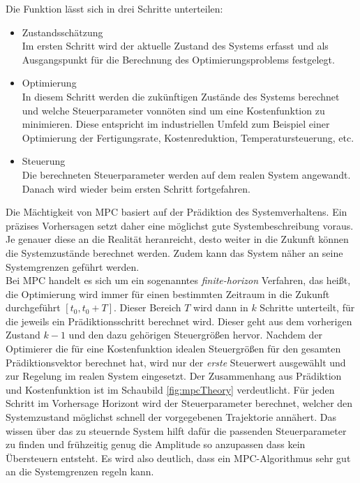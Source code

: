 \documentclass{like}
\begin{document}
Die Funktion lässt sich in drei Schritte unterteilen:
\begin{itemize}
	\item Zustandsschätzung \\ Im ersten Schritt wird der aktuelle Zustand des Systems erfasst und als Ausgangspunkt für die Berechnung des Optimierungsproblems festgelegt.
	\item Optimierung \\ In diesem Schritt werden die zukünftigen Zustände des Systems berechnet und welche Steuerparameter vonnöten sind um eine Kostenfunktion zu minimieren. Diese entspricht im industriellen Umfeld zum Beispiel einer Optimierung der Fertigungsrate, Kostenreduktion,  Temperatursteuerung, etc.
	\item Steuerung \\ Die berechneten Steuerparameter werden auf dem realen System angewandt. Danach wird wieder beim ersten Schritt fortgefahren.   
\end{itemize}


Die Mächtigkeit von \ac{MPC} basiert auf der Prädiktion des Systemverhaltens. Ein präzises Vorhersagen setzt daher eine möglichst gute Systembeschreibung voraus. Je genauer diese an die Realität heranreicht, desto weiter in die Zukunft können die Systemzustände berechnet werden. Zudem kann das System näher an seine Systemgrenzen geführt werden. \\
Bei \acl{MPC} handelt es sich um ein sogenanntes \textit{finite-horizon} Verfahren, das heißt, die Optimierung wird immer für einen bestimmten Zeitraum in die Zukunft durchgeführt $ [t_0, t_0 + T] $. Dieser Bereich \(T\) wird dann in \(k\) Schritte unterteilt, für die jeweils ein Prädiktionsschritt berechnet wird. Dieser geht aus dem vorherigen Zustand $k -1$ und den dazu gehörigen Steuergrößen hervor. Nachdem der Optimierer die für eine Kostenfunktion idealen Steuergrößen für den gesamten Prädiktionsvektor berechnet hat, wird nur der \emph{erste} Steuerwert ausgewählt und zur Regelung im realen System eingesetzt. Der Zusammenhang aus Prädiktion und Kostenfunktion ist im Schaubild \ref{fig:mpcTheory} verdeutlicht. Für jeden Schritt im Vorhersage Horizont wird der Steuerparameter berechnet, welcher den Systemzustand möglichst schnell der vorgegebenen Trajektorie annähert. Das wissen über das zu steuernde System hilft dafür die passenden Steuerparameter zu finden und frühzeitig genug die Amplitude so anzupassen dass kein Übersteuern entsteht. Es wird also deutlich, dass ein \ac{MPC}-Algorithmus sehr gut an die Systemgrenzen regeln kann.
\end{document}

